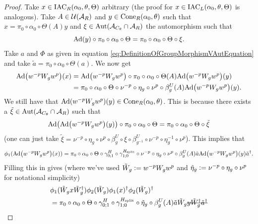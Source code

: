 \documentclass[11pt,a4paper,twoside]{article}
\numberwithin{equation}{section}
\begin{document}
	\begin{proof}
		Take $x\in \textrm{IAC}_R(\alpha_0,\theta,\Theta)$ arbitrary (the proof for $x\in \textrm{IAC}_L(\alpha_0,\theta,\Theta)$ is analogous). Take $A\in\mathcal U(\mathcal A_R)$ and $y\in\textrm{Cone}_R(\alpha_0,\theta)$ such that $x=\pi_0\circ\alpha_0\circ\Theta(A)y$ and $\xi\in\Aut{\AA_{C_\theta}\cap \AA_R}$ the automorphism such that
		\begin{equation}
			\Ad{y}\circ\pi_0\circ\alpha_0\circ\Theta=\pi_0\circ\alpha_0\circ\Theta\circ\xi.
		\end{equation}
		Take $a$ and $\Phi$ as given in equation \eqref{eq:DefinitionOfGroupMorphismVAutEquation} and take $\tilde{a}=\pi_0\circ\alpha_0\circ\Theta(a)$. We now get
		\begin{align}
			\Ad{w^{-p}W_gw^{p}} (x) &=\Ad{w^{-p}W_gw^{p}}\circ\pi_0\circ\alpha_0\circ\Theta(A) \Ad{w^{-p}W_gw^{p}}(y)\\
			&=\pi_0\circ\alpha_0\circ\Theta\circ\nu^{-p}\circ\eta_g\circ\nu^{p}\circ\beta_g^U(A) \Ad{w^{-p}W_gw^{p}}(y).
		\end{align}
		We still have that $\Ad{w^{-p}W_gw^{p}}(y)\in\cone_R(\alpha_0,\theta)$. This is because there exists a $\tilde{\xi}\in\Aut{\AA_{C_\theta}\cap \AA_R}$ such that
		\begin{equation}
			\Ad{\Ad{w^{-p}W_gw^{p}}(y)}\circ \pi_0\circ\alpha_0\circ\Theta=\pi_0\circ\alpha_0\circ\Theta\circ\tilde\xi
		\end{equation}
		(one can just take $\tilde\xi=\nu^{-p}\circ\eta_g\circ\nu^{p}\circ\beta_g^U\circ\xi\circ\beta_{g^{-1}}^U\circ\nu^{-p}\circ\eta_g^{-1}\circ\nu^{p}$). This implies that
		\begin{equation}\label{eq:lem:phi1phi2matchingCondition:Proof_W_g_PartAppendix}
			\phi_1(\Ad{w^{-p}W_gw^{p}}(x))=\pi_0\circ\alpha_0\circ\Theta\circ\gamma^{H}_{0;1}\circ\gamma^{\Hsplit}_{1;0}\circ\nu^{-p}\circ\eta_g\circ\nu^{p}\circ\beta_g^U(A)\tilde{a}\Ad{w^{-p}W_gw^{p}}(y)\tilde{a}^\dagger.
		\end{equation}
		Filling this in gives (where we've used $\tilde{W}_g\vcentcolon= w^{-p}W_g w^{p}$ and $\tilde{\eta}_g\vcentcolon= \nu^{-p}\circ\eta_g\circ\nu^{p}$ for notational simplicity)
		\begin{align}
			&\phi_1(\tilde{W}_gx\tilde{W}_g^\dagger)\phi_2(\tilde{W}_g)\phi_1(x)^\dagger\phi_2(\tilde{W}_g)^\dagger\\
			\label{eq:phi1phi2matchingConditionEquationAppendix}
			&=\pi_0\circ\alpha_0\circ\Theta\circ\gamma^{H}_{0;1}\circ\gamma^{\Hsplit}_{1;0}\circ\tilde{\eta}_g\circ\beta_g^U(A)\tilde{a}\tilde{W}_g\stkout{y\tilde{W}_g^\dagger\tilde{a}^\dagger}\\

\end{align}
\end{proof}
\end{document}
